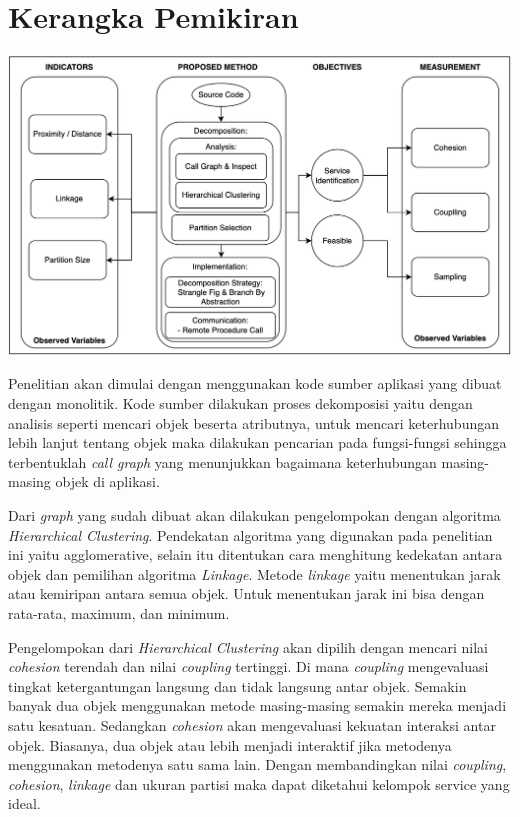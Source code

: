 \section{Kerangka Pemikiran}
\begin{center}
	\includegraphics[width=14cm]{img/bab_3/KerangkaPemikiran.png}
	\label{fig:kerangka_pemikiran}
\end{center}

Penelitian akan dimulai dengan menggunakan kode sumber aplikasi yang dibuat dengan monolitik. Kode sumber dilakukan proses dekomposisi yaitu dengan analisis seperti mencari objek beserta atributnya, untuk mencari keterhubungan lebih lanjut tentang objek maka dilakukan pencarian pada fungsi-fungsi sehingga terbentuklah \textit{call graph} yang menunjukkan bagaimana keterhubungan masing-masing objek di aplikasi.

Dari \textit{graph} yang sudah dibuat akan dilakukan pengelompokan dengan algoritma \textit{Hierarchical Clustering}. Pendekatan algoritma yang digunakan pada penelitian ini yaitu agglomerative, selain itu ditentukan cara menghitung kedekatan antara objek dan pemilihan algoritma \textit{Linkage}. Metode \textit{linkage} yaitu menentukan jarak atau kemiripan antara semua objek. Untuk menentukan jarak ini bisa dengan rata-rata, maximum, dan minimum. 

Pengelompokan dari \textit{Hierarchical Clustering} akan dipilih dengan mencari nilai \textit{cohesion} terendah dan  nilai \textit{coupling} tertinggi. Di mana \textit{coupling} mengevaluasi tingkat ketergantungan langsung dan tidak langsung antar objek. Semakin banyak dua objek menggunakan metode masing-masing semakin mereka menjadi satu kesatuan. Sedangkan  \textit{cohesion} akan mengevaluasi kekuatan interaksi antar objek. Biasanya, dua objek atau lebih menjadi interaktif jika metodenya menggunakan metodenya satu sama lain. Dengan membandingkan nilai  \textit{coupling}, \textit{cohesion}, \textit{linkage} dan ukuran partisi maka dapat diketahui kelompok service yang ideal.

